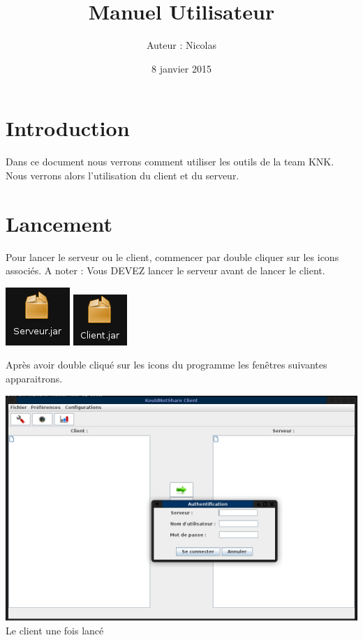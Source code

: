 \documentclass[12pt,a4paper]{article}
\title{Manuel Utilisateur}
\author{Auteur : Nicolas \bsc{REYNAUD}}
\date{8 janvier 2015}
\begin{document}
\maketitle

\newpage

\section{Introduction}

Dans ce document nous verrons comment utiliser les outils de la team KNK.\\

Nous verrons alors l'utilisation du client et du serveur.

\section{Lancement}

Pour lancer le serveur ou le client, commencer par double cliquer sur les icons associés.
A noter : Vous DEVEZ lancer le serveur avant de lancer le client.

\includegraphics[scale=0.6]{images/serveur.png} 
\includegraphics[scale=0.7]{images/client.png}

Après avoir double cliqué sur les icons du programme les fenêtres suivantes apparaitrons. 

\begin{center}

\includegraphics[scale=0.3]{images/clientlance.png} \\
Le client une fois lancé

\end{center}
\end{document}
